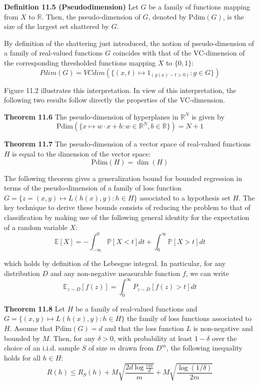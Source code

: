 \documentclass[fleqn,10pt]{olplainarticle}
\begin{document}
\textbf{Definition 11.5 (Pseudodimension)} Let $G$ be a family of functions mapping from $X$ to $\mathbb{R}$. Then, the pseudo-dimension of $G$, denoted by $\text{Pdim}(G)$, is the size of the largest set shattered by $G$.

By definition of the shattering just introduced, the notion of pseudo-dimension of a family of real-valued functions $G$ coincides with that of the VC-dimension of the corresponding thresholded functions mapping $X$ to $\{0, 1\}$:
\[
Pdim(G) = VCdim\left(\{(x, t) \mapsto 1_{(g(x) - t > 0)}: g \in G\}\right)
\]


Figure 11.2 illustrates this interpretation. In view of this interpretation, the following two results follow directly the properties of the VC-dimension.

\textbf{Theorem 11.6} The pseudo-dimension of hyperplanes in $\mathbb{R}^N$ is given by
\[ \text{Pdim}\left(\{x \mapsto w \cdot x + b : w \in \mathbb{R}^N, b \in \mathbb{R}\}\right) = N + 1 \]

\textbf{Theorem 11.7} The pseudo-dimension of a vector space of real-valued functions $H$ is equal to the dimension of the vector space:
\[ \text{Pdim}(H) = \dim(H) \]

The following theorem gives a generalization bound for bounded regression in terms of the pseudo-dimension of a family of loss function $G = \{ z = (x, y) \mapsto L(h(x), y) : h \in H\}$ associated to a hypothesis set $H$. The key technique to derive these bounds consists of reducing the problem to that of classification by making use of the following general identity for the expectation of a random variable $X$:
\[ \mathbb{E}[X] = -\int_{-\infty}^{0} \mathbb{P}[X < t]dt + \int_0^{\infty} \mathbb{P}[X > t]dt \]

which holds by definition of the Lebesgue integral. In particular, for any distribution $D$ and any non-negative measurable function $f$, we can write
\[ \mathbb{E}_{z \sim D}[f(z)] = \int_0^{\infty} P_{z \sim D}[f(z) > t]dt \]

\textbf{Theorem 11.8} Let $H$ be a family of real-valued functions and $G = \{(x, y) \mapsto L(h(x), y) : h \in H\}$ the family of loss functions associated to $H$. Assume that $\text{Pdim}(G) = d$ and that the loss function $L$ is non-negative and bounded by $M$. Then, for any $\delta > 0$, with probability at least $1 - \delta$ over the choice of an i.i.d. sample $S$ of size $m$ drawn from $D^m$, the following inequality holds for all $h \in H$:
\[ R(h) \leq \hat{R}_S(h) + M\sqrt{\frac{2d \log \frac{e m}{d}}{m}} + M\sqrt{\frac{\log (1/\delta)}{2m}} \]
\end{document}
